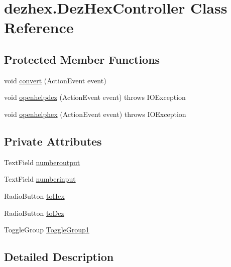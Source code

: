 \hypertarget{classdezhex_1_1_dez_hex_controller}{}\section{dezhex.\+Dez\+Hex\+Controller Class Reference}
\label{classdezhex_1_1_dez_hex_controller}
\subsection*{Protected Member Functions}
\begin{DoxyCompactItemize}
\item 
void \hyperlink{classdezhex_1_1_dez_hex_controller_a6ba80928376057f4ec83a748f0dbc142}{convert} (Action\+Event event)
\item 
void \hyperlink{classdezhex_1_1_dez_hex_controller_ad1d7a5bb625081bc9128192e0773a233}{openhelpdez} (Action\+Event event)  throws I\+O\+Exception 	
\item 
void \hyperlink{classdezhex_1_1_dez_hex_controller_a4b75d5bbb7115f42a7100074b4038bed}{openhelphex} (Action\+Event event)  throws I\+O\+Exception 	
\end{DoxyCompactItemize}
\subsection*{Private Attributes}
\begin{DoxyCompactItemize}
\item 
Text\+Field \hyperlink{classdezhex_1_1_dez_hex_controller_aec495133208c435c31fb55d0485b4817}{numberoutput}
\item 
Text\+Field \hyperlink{classdezhex_1_1_dez_hex_controller_a12c00215edb2e800ada95de241beaffc}{numberinput}
\item 
Radio\+Button \hyperlink{classdezhex_1_1_dez_hex_controller_ab2923a14b89371f8ebd0e52f2a4ba98c}{to\+Hex}
\item 
Radio\+Button \hyperlink{classdezhex_1_1_dez_hex_controller_a8d4a5eaa39db2cb0162ce614c3dc66ce}{to\+Dez}
\item 
Toggle\+Group \hyperlink{classdezhex_1_1_dez_hex_controller_aaf2c68f18e2584591fda888fe5b46578}{Toggle\+Group1}
\end{DoxyCompactItemize}


\subsection{Detailed Description}



